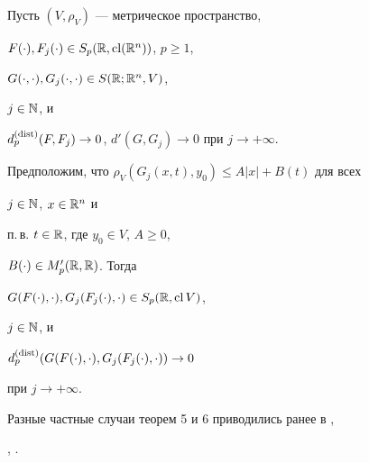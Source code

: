 \begin{thm}


Пусть $(V,\rho_V)$ --- метрическое пространство,


$F(\cdot),F_j(\cdot)\in S_p(\Bbb R,\operatorname{cl}(\Bbb R^n))$, $p\ge 1$,


$G(\cdot,\cdot),G_j(\cdot,\cdot)\in S(\Bbb R;\Bbb R^n,V)$,


$j\in \Bbb N$, и


$d^{(\operatorname{dist})}_p(F,F_j)\to 0$, $d'(G,G_j)\to 0$ при $j\to+\infty$.


Предположим, что $\rho_V(G_j(x,t),y_0)\le A|x|+B(t)$ для всех


$j\in\Bbb N$, $x\in\Bbb R^n$ и


п.\,в. $t\in\Bbb R$, где $y_0\in V$, $A\ge 0$,


$B(\cdot)\in M'_p(\Bbb R,\Bbb R)$. Тогда


$G(F(\cdot),\cdot),G_j(F_j(\cdot),\cdot)\in S_p(\Bbb R,\operatorname{cl} V)$,


$j\in\Bbb N$, и


$d^{(\operatorname{dist})}_p(G(F(\cdot),\cdot),G_j(F_j(\cdot),\cdot))\to 0$


при $j\to+\infty$.


\end{thm}





Разные частные случаи теорем 5 и 6 приводились ранее в \cite{13},


\cite{16}, \cite{17}.





